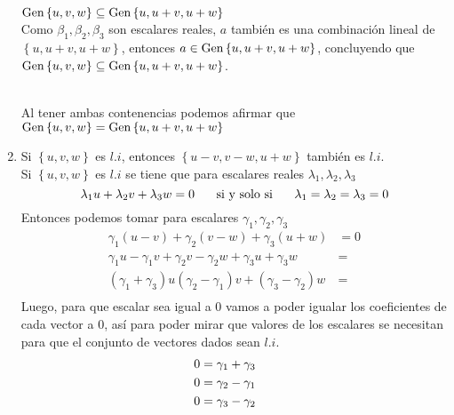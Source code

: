 \begin{enumerate}[label=\listAlph]
\begin{mathcase}{{\(\text{Gen} \left\{ u, v, w \right\} \subseteq \text{Gen} \left\{ u, u + v, u + w \right\}\)}}
\[                \]
                Como \(\beta_1, \beta_2, \beta_3\) son escalares reales, \(a\) también es una combinación lineal de \(\left\{u, u + v, u + w\right\}\),
                entonces \(a \in \text{Gen} \left\{ u, u + v, u + w \right\}\), concluyendo que \(\text{Gen} \left\{ u, v, w \right\} \subseteq \text{Gen} \left\{ u, u + v, u + w \right\}\).
            \end{mathcase}
            \\
            Al tener ambas contenencias podemos afirmar que \(\text{Gen} \left\{ u, v, w \right\} = \text{Gen} \left\{ u, u + v, u + w \right\}\)
        \item Si \(\left\{u, v, w\right\}\) es \(l.i\), entonces \(\left\{u - v, v - w, u + w\right\}\) también es \(l.i\). \\
            Si \(\left\{u, v, w\right\}\) es \(l.i\) se tiene que para escalares reales \(\lambda_1, \lambda_2, \lambda_3\)
            \[
                \lambda_1 u + \lambda_2 v + \lambda_3 w = 0 
                \hspace{0.5cm}
                \text{ si y solo si }
                \hspace{0.5cm}
                \lambda_1 = \lambda_2 = \lambda_3 = 0
            \]
            Entonces podemos tomar para escalares \(\gamma_1, \gamma_2, \gamma_3\)
            \[
                \begin{aligned}
                    \gamma_1 (u - v) + \gamma_2 (v - w) + \gamma_3 (u + w) &= 0 \\
                    \gamma_1 u - \gamma_1 v + \gamma_2 v - \gamma_2 w + \gamma_3 u + \gamma_3 w &= \\
                    (\gamma_1 + \gamma_3) u (\gamma_2 - \gamma_1)v + (\gamma_3 - \gamma_2) w &= \\
                \end{aligned}
            \]
            Luego, para que escalar sea igual a 0 vamos a poder igualar los coeficientes de cada vector a 0, así para poder mirar que valores de 
            los escalares se necesitan para que el conjunto de vectores dados sean \(l.i\).
            \[
                \begin{aligned}
                    0 &= \gamma_1 + \gamma_3 \\
                    0 &= \gamma_2 - \gamma_1 \\
                    0 &= \gamma_3 - \gamma_2 \\
                \end{aligned}
                \hspace{0.5cm}
                \begin{aligned}

\end{aligned}\]
\end{enumerate}

